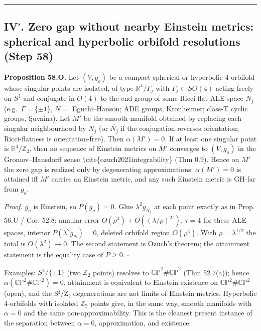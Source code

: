 \documentclass[
  10pt,
]{report}
\begin{document}
\begin{center}\rule{0.5\linewidth}{0.5pt}\end{center}

\hypertarget{iv.-zero-gap-without-nearby-einstein-metrics-spherical-and-hyperbolic-orbifold-resolutions-step-58}{%
\subsection{IV′. Zero gap without nearby Einstein metrics: spherical and
hyperbolic orbifold resolutions (Step
58)}\label{iv.-zero-gap-without-nearby-einstein-metrics-spherical-and-hyperbolic-orbifold-resolutions-step-58}}

\textbf{Proposition 58.O.} Let \((V,g_o)\) be a compact spherical or
hyperbolic 4-orbifold whose singular points are isolated, of type
\(\mathbb R^4/\Gamma_j\) with \(\Gamma_j\subset SO(4)\) acting freely on
\(S^3\) and conjugate in \(O(4)\) to the end group of some Ricci-flat
ALE space \(N_j\) (e.g.~\(\Gamma=\{\pm1\}\), \(N=\) Eguchi--Hanson; ADE
groups, Kronheimer; class-T cyclic groups, Şuvaina). Let \(M'\) be the
smooth manifold obtained by replacing each singular neighbourhood by
\(N_j\) (or \(\overline{N_j}\) if the conjugation reverses orientation;
Ricci-flatness is orientation-free). Then \(\alpha(M')=0\). If at least
one singular point is \(\mathbb R^4/\mathbb Z_2\), then no sequence of
Einstein metrics on \(M'\) converges to \((V,g_o)\) in the
Gromov--Hausdorff sense \textbackslash cite\{ozuch2021integrability\}
(Thm 0.9). Hence on \(M'\) the zero gap is realized only by degenerating
approximations: \(\alpha(M')=0\) is attained iff \(M'\) carries an
Einstein metric, and any such Einstein metric is GH-far from \(g_o\).

\emph{Proof.} \(g_o\) is Einstein, so \(P(g_o)=0\). Glue
\(\lambda^2g_{N_j}\) at each point exactly as in Prop. 56.U / Cor. 52.8:
annular error \(O(\rho^4)+O((\lambda/\rho)^{2\tau})\), \(\tau=4\) for
these ALE spaces, interior \(P(\lambda^2g_N)=0\), deleted orbifold
region \(O(\rho^4)\). With \(\rho=\lambda^{1/2}\) the total is
\(O(\lambda^2)\to0\). The second statement is Ozuch's theorem; the
attainment statement is the equality case of \(P\ge0\). \(\square\)

Examples: \(S^4/\{\pm1\}\) (two \(\mathbb Z_2\) points) resolves to
\(\overline{\mathbb{CP}}^2\#\overline{\mathbb{CP}}^2\) (Thm 52.7(a));
hence \(\alpha(\mathbb{CP}^2\#\mathbb{CP}^2)=0\), attainment is
equivalent to Einstein existence on \(\mathbb{CP}^2\#\mathbb{CP}^2\)
(open), and the S⁴/Z₂ degenerations are not limits of Einstein metrics.
Hyperbolic 4-orbifolds with isolated \(\mathbb Z_2\) points give, in the
same way, smooth manifolds with \(\alpha=0\) and the same
non-approximability. This is the cleanest present instance of the
separation between \(\alpha=0\), approximation, and existence.
\end{document}
